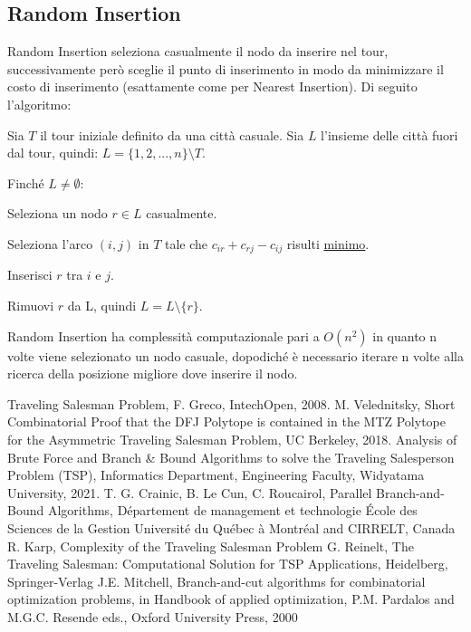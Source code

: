 \documentclass[a4paper,12pt]{report}
\begin{document}
\subsection{Random Insertion}
Random Insertion seleziona casualmente il nodo da inserire nel tour, successivamente però sceglie il punto di inserimento in modo da minimizzare il costo di inserimento (esattamente come per Nearest Insertion). Di seguito l'algoritmo:

\begin{tcolorbox}[colframe=black,colback=white,boxrule=0.5pt, sharp corners]
\begin{legal}
  \item Sia $T$ il tour iniziale definito da una città casuale. Sia $L$ l'insieme delle città fuori dal tour, quindi: $L = \{1, 2, ..., n\} \setminus T$.
  \item Finché $L \neq \emptyset$:
  \begin{legal}
    \item Seleziona un nodo $r \in L$ casualmente.
    \item Seleziona l'arco $(i, j)$ in $T$ tale che $c_{ir} + c_{rj} - c_{ij}$ risulti \underline{minimo}.
    \item Inserisci $r$ tra $i$ e $j$.  
    \item Rimuovi $r$ da L, quindi $L = L \setminus \{r\}$.
  \end{legal}
\end{legal}
\end{tcolorbox}
\hfill \break Random Insertion ha complessità computazionale pari a $O(n^2)$ in quanto n volte viene selezionato un nodo casuale, dopodiché è necessario iterare n volte alla ricerca della posizione migliore dove inserire il nodo.
%
%

%
%

\begin{thebibliography}{00}
Traveling Salesman Problem, F. Greco, IntechOpen, 2008.
M. Velednitsky, Short Combinatorial Proof that the DFJ Polytope is contained in
the MTZ Polytope for the Asymmetric Traveling Salesman Problem, UC Berkeley, 2018.
%
Analysis of Brute Force and Branch \& Bound Algorithms to solve the Traveling
Salesperson Problem (TSP), Informatics Department, Engineering Faculty, Widyatama University, 2021.
%
T. G. Crainic, B. Le Cun, C. Roucairol, Parallel Branch-and-Bound Algorithms, Département de management et technologie École des Sciences de la Gestion Université du Québec à Montréal and CIRRELT, Canada
%
R. Karp, Complexity of the Traveling Salesman Problem
%
G. Reinelt, The Traveling Salesman: Computational Solution for TSP Applications, Heidelberg, Springer-Verlag
J.E. Mitchell, Branch-and-cut algorithms for combinatorial
optimization problems, in Handbook of applied optimization, P.M.
Pardalos and M.G.C. Resende eds., Oxford University Press, 2000
%
\end{thebibliography}
% 
\end{document}
